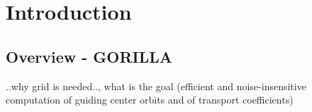 \documentclass[main.tex]{subfiles}
\begin{document}
\chapter{Introduction}
\label{chp:introduction}
\section{Overview - GORILLA}
..why grid is needed.., what is the goal (efficient and noise-insensitive computation of guiding center orbits and of transport coefficients)
\end{document}
